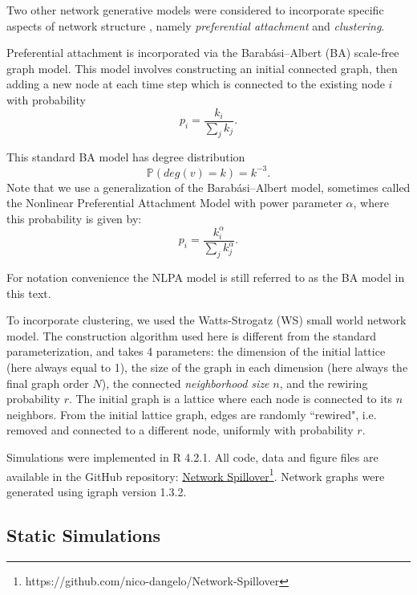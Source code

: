 \documentclass{article}
\theoremstyle{definition}
\begin{document}
Two other network generative models were considered to incorporate specific aspects of network structure , namely \textit{preferential attachment} and \textit{clustering}. 

Preferential attachment is incorporated via the Barabási–Albert (BA) scale-free graph model. This model involves constructing an initial connected graph, then adding a new node at each time step which is connected to the existing node $i$ with probability 
\begin{equation*}
    p_{i}=\frac{k_{i}}{\sum_{j}k_{j}}.
\end{equation*}

This standard BA model has degree distribution
\begin{equation*}
    \mathbb{P}(deg(v)=k)=k^{-3}.
\end{equation*}
Note that we use a generalization of the Barabási–Albert model, sometimes called the Nonlinear Preferential Attachment Model with power parameter $\alpha$, where this probability is given by:
\begin{equation*}
    p_{i}=\frac{k_{i}^{\alpha}}{\sum_{j}k_{j}^{\alpha}}.
\end{equation*}

For notation convenience the NLPA model is still referred to as the BA model in this text.

To incorporate clustering, we used the Watts-Strogatz (WS) small world network model. The construction algorithm used here is different from the standard parameterization, and takes 4 parameters: the dimension of the initial lattice (here always equal to 1), the size of the graph in each dimension (here always the final graph order $N$), the connected \textit{neighborhood size} $n$, and the rewiring probability $r$. The initial graph is a lattice where each node is connected to its $n$ neighbors. From the initial lattice graph, edges are randomly ``rewired", i.e. removed and connected to a different node, uniformly with probability $r$.



Simulations were implemented in R 4.2.1. All code, data and figure files are available in the GitHub repository: \href{https://github.com/nico-dangelo/Network-Spillover}{Network Spillover}\footnote{https://github.com/nico-dangelo/Network-Spillover}. Network graphs were generated using igraph version 1.3.2.
\subsection{Static Simulations}
\end{document}
